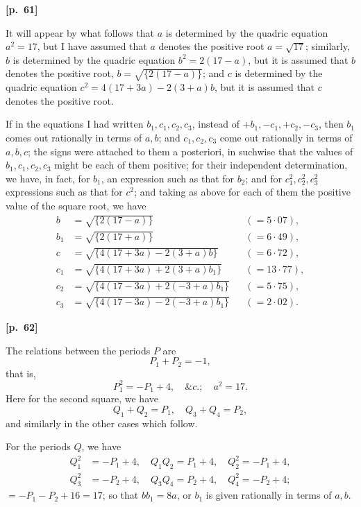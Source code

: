 \documentclass[11pt,a4paper]{book}
\begin{document}
\vspace{0.5em}
\noindent\textbf{[p.\ 61]}

It will appear by what follows that $a$ is determined by the quadric equation $a^2 = 17$, but I have assumed that $a$ denotes the positive root $a = \sqrt{17}$; similarly, $b$ is determined by the quadric equation $b^2 = 2(17 - a)$, but it is assumed that $b$ denotes the positive root, $b = \sqrt{\{2(17 - a)\}}$; and $c$ is determined by the quadric equation $c^2 = 4(17 + 3a) - 2(3 + a)b$, but it is assumed that $c$ denotes the positive root.

If in the equations I had written $b_1, c_1, c_2, c_3$, instead of $+b_1, -c_1, +c_2, -c_3$, then $b_1$ comes out rationally in terms of $a, b$; and $c_1, c_2, c_3$ come out rationally in terms of $a, b, c$; the signs were attached to them a posteriori, in suchwise that the values of $b_1, c_1, c_2, c_3$ might be each of them positive; for their independent determination, we have, in fact, for $b_1$, an expression such as that for $b_2$; and for $c_1^2, c_2^2, c_3^2$ expressions such as that for $c^2$; and taking as above for each of them the positive value of the square root, we have
\begin{align*}
b &= \sqrt{\{2(17 - a)\}} && (= 5\cdot 07), \\
b_1 &= \sqrt{\{2(17 + a)\}} && (= 6\cdot 49), \\
c &= \sqrt{\{4(17 + 3a) - 2(3 + a)b\}} && (= 6\cdot 72), \\
c_1 &= \sqrt{\{4(17 + 3a) + 2(3 + a)b_1\}} && (= 13\cdot 77), \\
c_2 &= \sqrt{\{4(17 - 3a) + 2(-3 + a)b_1\}} && (= 5\cdot 75), \\
c_3 &= \sqrt{\{4(17 - 3a) - 2(-3 + a)b_1\}} && (= 2\cdot 02).
\end{align*}

\vspace{0.5em}
\noindent\textbf{[p.\ 62]}

The relations between the periods $P$ are
$$
P_1 + P_2 = -1,
$$
that is,
$$
P_1^2 = -P_1 + 4, \quad \&c.; \quad a^2 = 17.
$$
Here for the second square, we have
$$
Q_1 + Q_2 = P_1, \quad Q_3 + Q_4 = P_2,
$$
and similarly in the other cases which follow.

For the periods $Q$, we have
\begin{align*}
Q_1^2 &= -P_1 + 4, \quad Q_1 Q_2 = P_1 + 4, \quad Q_2^2 = -P_1 + 4, \\
Q_3^2 &= -P_2 + 4, \quad Q_3 Q_4 = P_2 + 4, \quad Q_4^2 = -P_2 + 4;
\end{align*}
$= -P_1 - P_2 + 16 = 17$; so that $bb_1 = 8a$, or $b_1$ is given rationally in terms of $a, b$.
\end{document}
